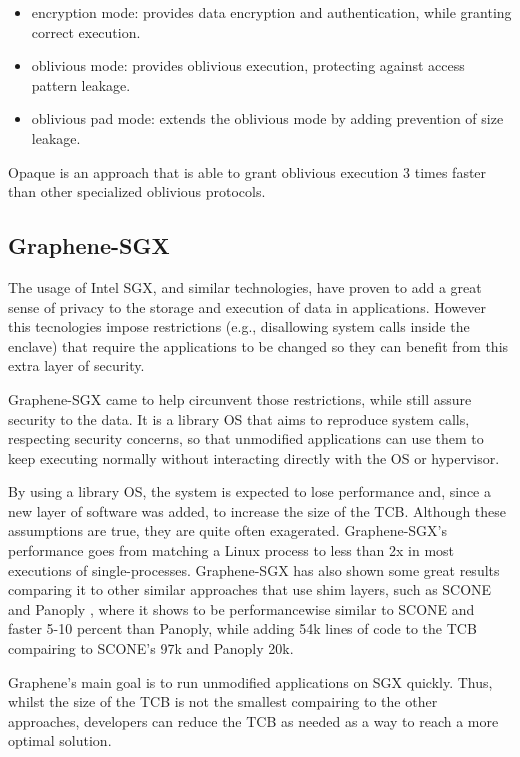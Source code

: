 \begin{itemize}
	\item encryption mode: provides data encryption and authentication, while granting correct execution.
	\item oblivious mode: provides oblivious execution, protecting against access pattern leakage.
	\item oblivious pad mode: extends the oblivious mode by adding prevention of size leakage.
\end{itemize}

Opaque is an approach that is able to grant oblivious execution 3 times faster than other specialized oblivious protocols.



\subsection{Graphene-SGX}

The usage of Intel SGX, and similar technologies, have proven to add a great sense of privacy to the storage and execution of data in applications. However this tecnologies impose restrictions (e.g., disallowing system calls inside the enclave) that require the applications to be changed so they can benefit from this extra layer of security. 

Graphene-SGX \cite{graphenePaper} came to help circunvent those restrictions, while still assure security to the data. It is a library OS that aims to reproduce system calls, respecting security concerns, so that unmodified applications can use them to keep executing normally without interacting directly with the OS or hypervisor. 

By using a library OS, the system is expected to lose performance and, since a new layer of software was added, to increase the size of the TCB. 
Although these assumptions are true, they are quite often exagerated. Graphene-SGX's performance goes from matching a Linux process to less than 2x in most executions of single-processes.
Graphene-SGX has also shown some great results comparing it to other similar approaches that use shim layers, such as SCONE \cite{sconePaper} and Panoply \cite{panoplyPaper}, where it shows to be performancewise similar to SCONE and faster 5-10 percent than Panoply, while adding 54k lines of code to the TCB compairing to SCONE's 97k and Panoply 20k.

Graphene's main goal is to run unmodified applications on SGX quickly. Thus, whilst the size of the TCB is not the smallest compairing to the other approaches, developers can reduce the TCB as needed as a way to reach a more optimal solution. 

